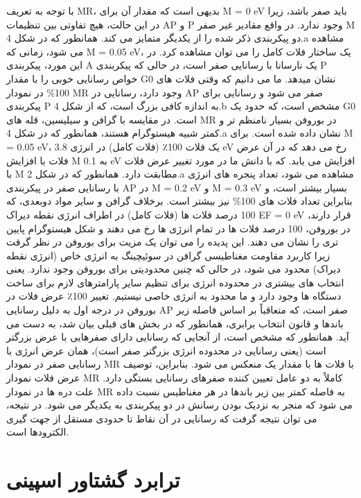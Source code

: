با توجه به تعریف MR، بدیهی است که مقدار آن برای M = 0 eV باید صفر باشد، زیرا در این حالت، هیچ تفاوتی بین تنظیمات AP و P وجود ندارد. در واقع مقادیر غیر صفر M دو پیکربندی ذکر شده را از یکدیگر متمایز می کند. همانطور که در شکل 4.a مشاهده می شود، زمانی که M = 0.05 eV، یک ساختار فلات کامل را می توان مشاهده کرد. در این مورد، پیکربندی A یک نارسانا با رسانایی صفر است، در حالی که پیکربندی P خواص رسانایی خوبی را با مقدار G0 نشان میدهد. ما می دانیم که وقتی فلات های 100\% در نمودار MR وجود دارد، رسانایی در AP صفر می شود و رسانایی برای پیکربندی P به اندازه کافی بزرگ است، که از شکل 4.b مشخص است، که حدود یک G0 است. در مقایسه با گرافن و سیلیسین، قله های MR در بوروفن بسیار نامنظم تر و کمتر شبیه هیستوگرام هستند، همانطور که در شکل 4.a نشان داده شده است. برای M = 0.05 eV، یک فلات 100٪ (فلات کامل) در انرژی 3.8 eV رخ می دهد که در آن عرض فلات با افزایش M به 0.1 eV افزایش می یابد. که با دانش ما در مورد تغییر عرض فلات با M مطابقت دارد.
همانطور که در شکل 2.a مشاهده می شود، تعداد پنجره های انرژی با رسانایی صفر در پیکربندی AP در M = 0.2 eV و M = 0.3 eV بسیار بیشتر است، و بنابراین تعداد فلات های 100\% نیز بیشتر است. برخلاف گرافن و سایر مواد دوبعدی، که 100 درصد فلات ها (فلات کامل) در اطراف انرژی نقطه دیراک EF = 0 eV قرار دارند، در بوروفن، 100 درصد فلات ها در تمام انرژی ها رخ می دهند و شکل هیستوگرام پایین تری را نشان می دهند. این پدیده را می توان یک مزیت برای بوروفن در نظر گرفت زیرا کاربرد مقاومت مغناطیسی گرافن در سوئیچینگ به انرژی خاص (انرژی نقطه دیراک) محدود می شود، در حالی که چنین محدودیتی برای بوروفن وجود ندارد. یعنی انتخاب های بیشتری در محدوده انرژی برای تنظیم سایر پارامترهای لازم برای ساخت دستگاه ها وجود دارد و ما محدود به انرژی خاصی نیستیم. تغییر 100٪ عرض فلات در بوروفن در درجه اول به دلیل رسانایی AP صفر است، که متعاقباً بر اساس فاصله زیر باندها و قانون انتخاب برابری، همانطور که در بخش های قبلی بیان شد، به دست می آید. همانطور که مشخص است، از آنجایی که رسانایی دارای صفرهایی با عرض بزرگتر است (یعنی رسانایی در محدوده انرژی بزرگتر صفر است)، همان عرض انرژی با رسانایی صفر در نمودار MR با فلات ها با مقدار یک منعکس می شود. بنابراین، توصیف عرض فلات نمودار MR کاملاً به دو عامل تعیین کننده صفرهای رسانایی بستگی دارد. علت دره ها در نمودار MR به فاصله کمتر بین زیر باندها در هر مغناطیس نسبت داده می شود که منجر به نزدیک بودن رسانش در دو پیکربندی به یکدیگر می شود. در نتیجه، می توان نتیجه گرفت که رسانایی در آن نقاط تا حدودی مستقل از جهت گیری الکترودها است. 
\section{ترابرد گشتاور اسپینی}

